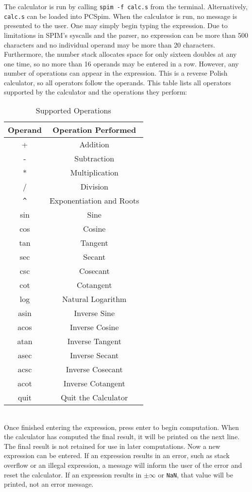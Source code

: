 \documentclass[10pt,letterpaper]{article}
\begin{document}
The calculator is run by calling \texttt{spim -f calc.s} from the terminal.
Alternatively, \texttt{calc.s} can be loaded into PCSpim. When the calculator is
run, no message is presented to the user. One may simply begin typing the
expression. Due to limitations in SPIM's syscalls and the parser, no expression
can be more than 500 characters and no individual operand may be more than 20
characters. Furthermore, the number stack allocates space for only sixteen
doubles at any one time, so no more than 16 operands may be entered in a row.
However, any number of operations can appear in the expression. This is a
reverse Polish calculator, so all operators follow the operands. This
table lists all operators supported by the calculator and the operations they
perform:
\begin{table}[h!]
    \centering
    \begin{tabular}[h!]{| c | c |}
        \hline
        Operand & Operation Performed\\
        \hline
        + & Addition\\
        \hline
        - & Subtraction\\
        \hline
        * & Multiplication\\
        \hline
        / & Division\\
        \hline
        \verb|^| & Exponentiation and Roots\\
        \hline
        sin & Sine\\
        \hline
        cos & Cosine\\
        \hline
        tan & Tangent\\
        \hline
        sec & Secant\\
        \hline
        csc & Cosecant\\
        \hline
        cot & Cotangent\\
        \hline
        log & Natural Logarithm\\
        \hline
        asin & Inverse Sine\\
        \hline
        acos & Inverse Cosine\\
        \hline
        atan & Inverse Tangent\\
        \hline
        asec & Inverse Secant\\
        \hline
        acsc & Inverse Cosecant\\
        \hline
        acot & Inverse Cotangent\\
        \hline
        quit & Quit the Calculator\\
        \hline
    \end{tabular}
    \caption{Supported Operations}
    \label{tab:ops}
\end{table}\\
Once finished entering the expression, press enter to begin computation. When
the calculator has computed the final result, it will be printed on the next
line. The final result is not retained for use in later computations. Now a new
expression can be entered. If an expression results in an error, such as stack
overflow or an illegal expression, a message will inform the user of the error
and reset the calculator. If an expression results in $\pm\infty$ or \texttt{NaN},
that value will be printed, not an error message.
\end{document}
